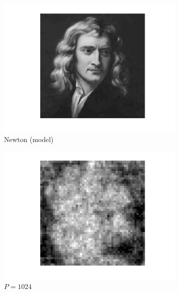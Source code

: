 \documentclass[english,11pt]{article}
\numberwithin{equation}{section}
\theoremstyle{plain}
\theoremstyle{definition}
\theoremstyle{remark}
\theoremstyle{plain}
\theoremstyle{remark}
\theoremstyle{plain}
\theoremstyle{plain}
\begin{document}
\begin{figure}[h!]
	\centering
	\begin{subfigure}[h]{0.25\textwidth}
		\centering
		\includegraphics[scale=0.3]{Newton}
		\caption{\label{fig:newton}Newton  (model)}
	\end{subfigure}%
	\begin{subfigure}[h]{0.25\textwidth}
		\centering
		\includegraphics[scale=0.3]{reconstruction2}
		\caption{\small $P =1024$}
	\end{subfigure}%
	\begin{subfigure}[h]{0.25\textwidth}
		\centering

\end{subfigure}
\end{figure}
\end{document}
